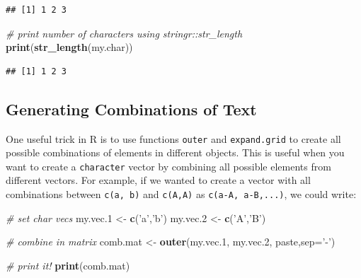 \documentclass[11pt,]{book}
\newenvironment{Shaded}{\begin{snugshade}}{\end{snugshade}}
\newcommand{\KeywordTok}[1]{\textcolor[rgb]{0.27,0.27,0.27}{\textbf{#1}}}
\newcommand{\DataTypeTok}[1]{\textcolor[rgb]{0.27,0.27,0.27}{#1}}
\newcommand{\DecValTok}[1]{\textcolor[rgb]{0.06,0.06,0.06}{#1}}
\newcommand{\StringTok}[1]{\textcolor[rgb]{0.5,0.5,0.5}{#1}}
\newcommand{\CommentTok}[1]{\textcolor[rgb]{0.56,0.35,0.01}{\textit{#1}}}
\newcommand{\NormalTok}[1]{#1}
\begin{document}
\begin{verbatim}
## [1] 1 2 3
\end{verbatim}

\begin{Shaded}
\begin{Highlighting}[]
\CommentTok{# print number of characters using stringr::str_length}
\KeywordTok{print}\NormalTok{(}\KeywordTok{str_length}\NormalTok{(my.char))}
\end{Highlighting}
\end{Shaded}

\begin{verbatim}
## [1] 1 2 3
\end{verbatim}

\subsection{Generating Combinations of
Text}\label{generating-combinations-of-text}

One useful trick in R is to use functions \texttt{outer} and
\texttt{expand.grid} to create all possible combinations of elements in
different objects. This is useful when you want to create a
\texttt{character} vector by combining all possible elements from
different vectors. For example, if we wanted to create a vector with all
combinations between
\texttt{c(\textquotesingle{}a\textquotesingle{},\ \textquotesingle{}b\textquotesingle{})}
and
\texttt{\textquotesingle{}c(\textquotesingle{}A\textquotesingle{},\textquotesingle{}A\textquotesingle{})}
as
\texttt{c(\textquotesingle{}a-A\textquotesingle{},\ \textquotesingle{}a-B\textquotesingle{},...)},
we could write:

\begin{Shaded}
\begin{Highlighting}[]
\CommentTok{# set char vecs}
\NormalTok{my.vec.}\DecValTok{1}\NormalTok{ <-}\StringTok{ }\KeywordTok{c}\NormalTok{(}\StringTok{'a'}\NormalTok{,}\StringTok{'b'}\NormalTok{)}
\NormalTok{my.vec.}\DecValTok{2}\NormalTok{ <-}\StringTok{ }\KeywordTok{c}\NormalTok{(}\StringTok{'A'}\NormalTok{,}\StringTok{'B'}\NormalTok{)}

\CommentTok{# combine in matrix}
\NormalTok{comb.mat <-}\StringTok{ }\KeywordTok{outer}\NormalTok{(my.vec.}\DecValTok{1}\NormalTok{, my.vec.}\DecValTok{2}\NormalTok{, paste,}\DataTypeTok{sep=}\StringTok{'-'}\NormalTok{)}

\CommentTok{# print it!}
\KeywordTok{print}\NormalTok{(comb.mat)}
\end{Highlighting}
\end{Shaded}
\end{document}
